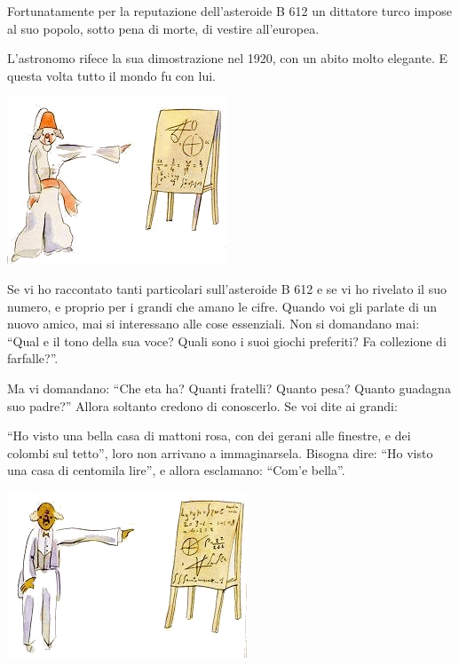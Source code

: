 \documentclass[11pt]{scrbook}
\begin{document}
Fortunatamente per la reputazione dell'asteroide B 612 un dittatore
turco impose al suo popolo, sotto pena di morte, di vestire all'europea.

L'astronomo rifece la sua dimostrazione nel 1920, con un abito molto
elegante. E questa volta tutto il mondo fu con lui.

\begin{center}
\includegraphics{./img/4c.png}

\end{center}

Se vi ho raccontato tanti particolari sull'asteroide B 612 e se vi ho
rivelato il suo numero, e proprio per i grandi che amano le cifre.
Quando voi gli parlate di un nuovo amico, mai si interessano alle cose
essenziali. Non si domandano mai: ``Qual e il tono della sua voce? Quali
sono i suoi giochi preferiti? Fa collezione di farfalle?''.

Ma vi domandano: ``Che eta ha? Quanti fratelli? Quanto pesa? Quanto
guadagna suo padre?'' Allora soltanto credono di conoscerlo. Se voi dite
ai grandi:

``Ho visto una bella casa di mattoni rosa, con dei gerani alle finestre,
e dei colombi sul tetto'', loro non arrivano a immaginarsela. Bisogna
dire: ``Ho visto una casa di centomila lire'', e allora esclamano:
``Com'e bella''.

\begin{center}
\includegraphics{./img/4d.png}

\end{center}
\end{document}
